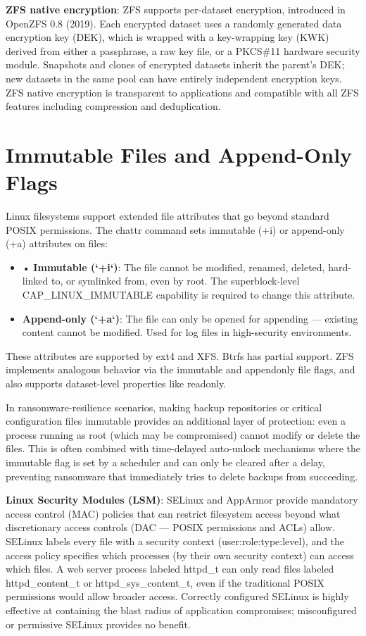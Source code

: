 \textbf{ZFS native encryption}: ZFS supports per-dataset encryption, introduced in OpenZFS 0.8 (2019). Each encrypted dataset uses a randomly generated data encryption key (DEK), which is wrapped with a key-wrapping key (KWK) derived from either a passphrase, a raw key file, or a PKCS\#11 hardware security module. Snapshots and clones of encrypted datasets inherit the parent's DEK; new datasets in the same pool can have entirely independent encryption keys. ZFS native encryption is transparent to applications and compatible with all ZFS features including compression and deduplication.

\section{Immutable Files and Append-Only Flags}
Linux filesystems support extended file attributes that go beyond standard POSIX permissions. The chattr command sets immutable (+i) or append-only (+a) attributes on files:

\begin{itemize}
  \item • \textbf{Immutable (`+i`)}: The file cannot be modified, renamed, deleted, hard-linked to, or symlinked from, even by root. The superblock-level CAP\_LINUX\_IMMUTABLE capability is required to change this attribute.
  \item \textbf{Append-only (`+a`)}: The file can only be opened for appending --- existing content cannot be modified. Used for log files in high-security environments.
\end{itemize}

These attributes are supported by ext4 and XFS. Btrfs has partial support. ZFS implements analogous behavior via the immutable and appendonly file flags, and also supports dataset-level properties like readonly.

In ransomware-resilience scenarios, making backup repositories or critical configuration files immutable provides an additional layer of protection: even a process running as root (which may be compromised) cannot modify or delete the files. This is often combined with time-delayed auto-unlock mechanisms where the immutable flag is set by a scheduler and can only be cleared after a delay, preventing ransomware that immediately tries to delete backups from succeeding.

\textbf{Linux Security Modules (LSM)}: SELinux and AppArmor provide mandatory access control (MAC) policies that can restrict filesystem access beyond what discretionary access controls (DAC --- POSIX permissions and ACLs) allow. SELinux labels every file with a security context (user:role:type:level), and the access policy specifies which processes (by their own security context) can access which files. A web server process labeled httpd\_t can only read files labeled httpd\_content\_t or httpd\_sys\_content\_t, even if the traditional POSIX permissions would allow broader access. Correctly configured SELinux is highly effective at containing the blast radius of application compromises; misconfigured or permissive SELinux provides no benefit.

